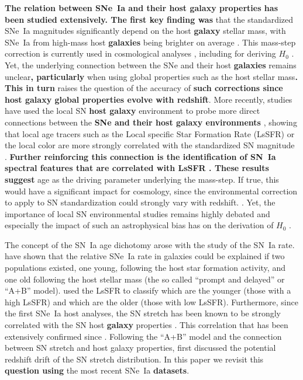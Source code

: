 \documentclass[referee]{aa}
\begin{document}
\textbf{The relation between SNe~Ia and their host galaxy properties has been
studied extensively. The first key finding was} that the standardized SNe~Ia
magnitudes significantly depend on the host \textbf{galaxy} stellar mass, with
SNe~Ia from high-mass host \textbf{galaxies} being brighter on average
\cite[e.g.][]{kelly2010, sullivan2010, childress2013, betoule2014, rigault2020,
kim19}. This mass-step correction is currently used in cosmological analyses
\citep[e.g.][]{betoule2014, scolnic2018a}, including for deriving $H_0$
\citep{riess2016, riess2019}. Yet, the underlying connection between the SNe and
their host \textbf{galaxies} remains unclear\textbf{, particularly} when using
global properties such as the host stellar mass\textbf{. This in turn} raises
the question of the accuracy of \textbf{such corrections since host galaxy
global properties evolve with redshift}. More recently, studies have used the
local SN \textbf{host galaxy} environment to probe more direct connections
between the \textbf{SNe and their host galaxy environments} \citep{rigault2013},
showing that local age tracers such as the Local specific Star Formation Rate
(LsSFR) or the local color are more strongly correlated with the standardized SN
magnitude \citep{roman2018, kim18,rigault2020}. \textbf{Further reinforcing this
connection is the identification of SN~Ia spectral features that are correlated
with LsSFR \citep{nordin2018}. These results suggest} age as the driving
parameter underlying the mass-step. If true, this would have a significant
impact for cosmology, since the environmental correction to apply to SN
standardization could strongly vary with redshift. \citep{rigault2013,
childress2014, scolnic2018a}. Yet, the importance of local SN environmental
studies remains highly debated \cite[e.g.][]{jones2015, jones2019} and
especially the impact of such an astrophysical bias has on the derivation of
$H_0$ \citep{jones2015, riess2016, riess2018, rose2019}. 

The concept of the SN~Ia age dichotomy arose with the study of the SN~Ia rate.
\cite{mannucci2005, scannapieco2005, sullivan2006, aubourg2008} have shown that
the relative SNe~Ia rate in galaxies could be explained if two populations
existed, one young, following the host star formation activity, and one old
following the host stellar mass (the so called ``prompt and delayed'' or ``A+B''
model). \cite{rigault2020} used the LsSFR to classify which are the younger
(those with a high LsSFR) and which are the older (those with low LsSFR).
Furthermore, since the first SNe~Ia host analyses, the SN stretch has been known
to be strongly correlated with the SN host \textbf{galaxy} properties
\citep{hamuy1996, hamuy2000}. This correlation that has been extensively
confirmed since \citep[e.g.][]{neill2009, sullivan2010, lampeitl2010, kelly2010,
gupta2011, dandrea2011, childress2013, rigault2013, pan2014, kim19}. Following
the ``A+B'' model and the connection between SN stretch and host galaxy
properties, \cite{howell2007} first discussed the potential redshift drift of
the SN stretch distribution. In this paper we revisit this \textbf{question
using} the most recent SNe~Ia \textbf{datasets}.
\end{document}
